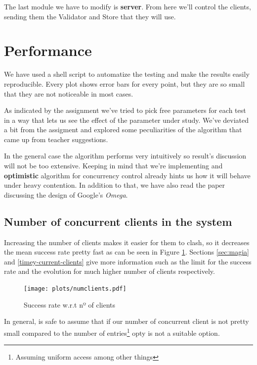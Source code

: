 \documentclass[a4paper, 10pt]{article}
\begin{document}
  The last module we have to modify is \textbf{server}. From here we'll control the clients, sending them the Validator and Store that they will use.

\clearpage
\section{Performance}

We have used a shell script to automatize the testing and make the results easily reproducible. Every plot shows error bars for every point, but they are so small that they are not noticeable in most cases.

As indicated by the assignment we've tried to pick free parameters for each test in a way that lets us see the effect of the parameter under study. We've deviated a bit from the assigment and explored some peculiarities of the algorithm that came up from teacher suggestions. 

In the general case the algorithm performs very intuitively so result's discussion will not be too extensive. Keeping in mind that we're implementing and \textbf{optimistic} algorithm for concurrency control already hints us how it will behave under heavy contention. In addition to that, we have also read the paper discussing the design of Google's \textit{Omega}.

\subsection{Number of concurrent clients in the system}
\label{sec:numclients}

Increasing the number of clients makes it easier for them to clash, so it decreases the mean success rate pretty fast as can be seen in Figure \ref{fig:numclients}. Sections \ref{sec:magia} and \ref{timey-current-clients} give more information such as the limit for the success rate and the evolution for much higher number of clients respectively.


\begin{figure}[H]
  \centering
  \texttt{[image: plots/numclients.pdf]}
    \caption{Success rate w.r.t nº of clients}
    \label{fig:numclients}
\end{figure} 

In general, is safe to assume that if our number of concurrent client is not pretty small compared to the number of entries\footnote{Assuming uniform access among other things} opty is not a suitable option.
\end{document}
